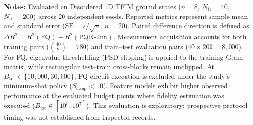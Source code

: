 \begin{table}[!t]
{\raggedright \footnotesize \textbf{Notes:} Evaluated on Disordered 1D TFIM ground states ($n=8$, $N_{\mathrm{tr}}=40$, $N_{\mathrm{te}}=200$) across 20 independent seeds. Reported metrics represent sample mean and standard error ($\mathrm{SE} = s / \sqrt{n}$, $n=20$). Paired difference direction is defined as $\Delta R^2 = R^2(\mathrm{FQ}) - R^2(\mathrm{PQK\text{-}2nn})$. Measurement acquisition accounts for both training pairs ($\binom{40}{2}=780$) and train--test evaluation pairs ($40 \times 200 = 8{,}000$). For FQ, eigenvalue thresholding (PSD clipping) is applied to the training Gram matrix, while rectangular test--train cross-blocks remain unclipped. At $B_{\mathrm{tot}} \in \{10{,}000, 30{,}000\}$, FQ circuit execution is excluded under the study's minimum-shot policy ($S_{\mathrm{swap}} < 10$). Feature models exhibit higher observed performance at the evaluated budget points where fidelity estimation was executed ($B_{\mathrm{tot}} \in [10^5, 10^7]$). This evaluation is exploratory; prospective protocol timing was not established from inspected records.\par}
\end{table}
